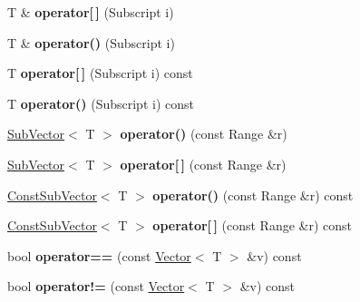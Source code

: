 \begin{DoxyCompactItemize}
\mbox{\label{classTLAS_1_1Vector_ad0ad71437f18f0105b46220ced451917}} 
T \& {\bfseries operator\mbox{[}$\,$\mbox{]}} (Subscript i)
\item 
\mbox{\label{classTLAS_1_1Vector_a845dc03e5990989f8da4ce7a5309016f}} 
T \& {\bfseries operator()} (Subscript i)
\item 
\mbox{\label{classTLAS_1_1Vector_afb0c652c5bd67b3b0e3e4c585dcdf422}} 
T {\bfseries operator\mbox{[}$\,$\mbox{]}} (Subscript i) const
\item 
\mbox{\label{classTLAS_1_1Vector_a5b04a60abde811475000b56b436fd635}} 
T {\bfseries operator()} (Subscript i) const
\item 
\mbox{\label{classTLAS_1_1Vector_a9c895b00200dfb9177ccfb53007ba07c}} 
\hyperlink{classTLAS_1_1SubVector}{Sub\+Vector}$<$ T $>$ {\bfseries operator()} (const Range \&r)
\item 
\mbox{\label{classTLAS_1_1Vector_a91142f437ebe19655bb30fc503ba7e49}} 
\hyperlink{classTLAS_1_1SubVector}{Sub\+Vector}$<$ T $>$ {\bfseries operator\mbox{[}$\,$\mbox{]}} (const Range \&r)
\item 
\mbox{\label{classTLAS_1_1Vector_a56e26eaa87a717b447edac32f614108f}} 
\hyperlink{classTLAS_1_1ConstSubVector}{Const\+Sub\+Vector}$<$ T $>$ {\bfseries operator()} (const Range \&r) const
\item 
\mbox{\label{classTLAS_1_1Vector_adf43cc2acf68a266688ddd9571ea75ed}} 
\hyperlink{classTLAS_1_1ConstSubVector}{Const\+Sub\+Vector}$<$ T $>$ {\bfseries operator\mbox{[}$\,$\mbox{]}} (const Range \&r) const
\item 
\mbox{\label{classTLAS_1_1Vector_ab56f5952caf2ebd798e4e8d200abf2ed}} 
bool {\bfseries operator==} (const \hyperlink{classTLAS_1_1Vector}{Vector}$<$ T $>$ \&v) const
\item 
\mbox{\label{classTLAS_1_1Vector_aaaa94aa70541b73a126769415ca9ca91}} 
bool {\bfseries operator!=} (const \hyperlink{classTLAS_1_1Vector}{Vector}$<$ T $>$ \&v) const

\end{DoxyCompactItemize}
